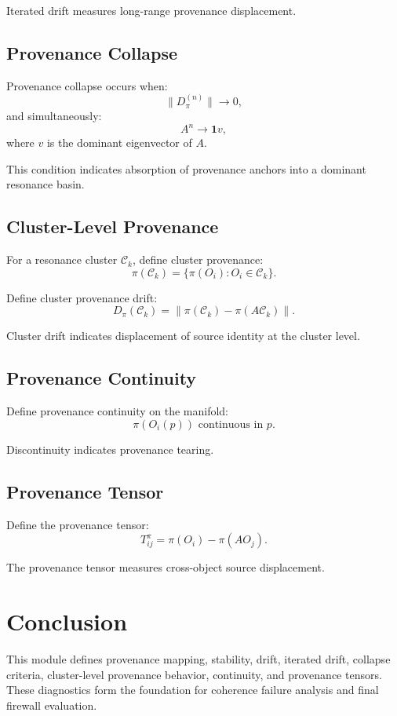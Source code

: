 Iterated drift measures long-range provenance displacement.

\subsection{Provenance Collapse}

Provenance collapse occurs when:
\[
\|D_{\pi}^{(n)}\| \to 0,
\]
and simultaneously:
\[
A^n \to \mathbf{1} v,
\]
where $v$ is the dominant eigenvector of $A$.

This condition indicates absorption of provenance anchors into a dominant
resonance basin.

\subsection{Cluster-Level Provenance}

For a resonance cluster $\mathcal{C}_k$, define cluster provenance:
\[
\pi(\mathcal{C}_k) = \{ \pi(O_i) : O_i \in \mathcal{C}_k \}.
\]

Define cluster provenance drift:
\[
D_{\pi}(\mathcal{C}_k)
  = \left\| \pi(\mathcal{C}_k) - \pi(A \mathcal{C}_k) \right\|.
\]

Cluster drift indicates displacement of source identity at the cluster level.

\subsection{Provenance Continuity}

Define provenance continuity on the manifold:
\[
\pi(O_i(p)) \text{ continuous in } p.
\]

Discontinuity indicates provenance tearing.

\subsection{Provenance Tensor}

Define the provenance tensor:
\[
T^{\pi}_{ij} = \pi(O_i) - \pi(A O_j).
\]

The provenance tensor measures cross-object source displacement.

\section{Conclusion}

This module defines provenance mapping, stability, drift, iterated drift,
collapse criteria, cluster-level provenance behavior, continuity, and
provenance tensors. These diagnostics form the foundation for coherence
failure analysis and final firewall evaluation.
